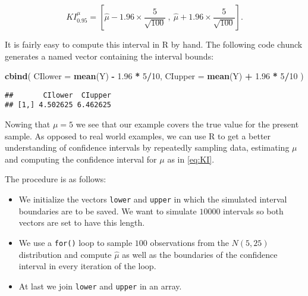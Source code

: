 \documentclass[]{book}
\newenvironment{Shaded}{\begin{snugshade}}{\end{snugshade}}
\newcommand{\KeywordTok}[1]{\textcolor[rgb]{0.13,0.29,0.53}{\textbf{#1}}}
\newcommand{\DataTypeTok}[1]{\textcolor[rgb]{0.13,0.29,0.53}{#1}}
\newcommand{\DecValTok}[1]{\textcolor[rgb]{0.00,0.00,0.81}{#1}}
\newcommand{\FloatTok}[1]{\textcolor[rgb]{0.00,0.00,0.81}{#1}}
\newcommand{\StringTok}[1]{\textcolor[rgb]{0.31,0.60,0.02}{#1}}
\newcommand{\OperatorTok}[1]{\textcolor[rgb]{0.81,0.36,0.00}{\textbf{#1}}}
\newcommand{\NormalTok}[1]{#1}
\providecommand{\tightlist}{%
  \setlength{\itemsep}{0pt}\setlength{\parskip}{0pt}}
\theoremstyle{definition}
\theoremstyle{definition}
\theoremstyle{definition}
\theoremstyle{remark}
\begin{document}
\begin{equation} 
KI^{\mu}_{0.95} = \left[\hat\mu - 1.96 \times \frac{5}{\sqrt{100}} \ , \ \hat\mu + 1.96 \times \frac{5}{\sqrt{100}}  \right]. \label{eq:KI}
\end{equation}

It is fairly easy to compute this interval in R by hand. The following
code chunck generates a named vector containing the interval bounds:

\begin{Shaded}
\begin{Highlighting}[]
\KeywordTok{cbind}\NormalTok{(}
  \DataTypeTok{CIlower =} \KeywordTok{mean}\NormalTok{(Y) }\OperatorTok{-}\StringTok{ }\FloatTok{1.96} \OperatorTok{*}\StringTok{ }\DecValTok{5}\OperatorTok{/}\DecValTok{10}\NormalTok{, }
  \DataTypeTok{CIupper =} \KeywordTok{mean}\NormalTok{(Y) }\OperatorTok{+}\StringTok{ }\FloatTok{1.96} \OperatorTok{*}\StringTok{ }\DecValTok{5}\OperatorTok{/}\DecValTok{10} 
\NormalTok{)}
\end{Highlighting}
\end{Shaded}

\begin{verbatim}
##       CIlower  CIupper
## [1,] 4.502625 6.462625
\end{verbatim}

Nowing that \(\mu = 5\) we see that our example covers the true value
for the present sample. As opposed to real world examples, we can use R
to get a better understanding of confidence intervals by repeatedly
sampling data, estimating \(\mu\) and computing the confidence interval
for \(\mu\) as in \eqref{eq:KI}.

The procedure is as follows:

\begin{itemize}
\tightlist
\item
  We initialize the vectors \texttt{lower} and \texttt{upper} in which
  the simulated interval boundaries are to be saved. We want to simulate
  \(10000\) intervals so both vectors are set to have this length.
\item
  We use a \texttt{for()} loop to sample \(100\) observations from the
  \(N(5,25)\) distribution and compute \(\hat\mu\) as well as the
  boundaries of the confidence interval in every iteration of the loop.
\item
  At last we join \texttt{lower} and \texttt{upper} in an array.
\end{itemize}
\end{document}
